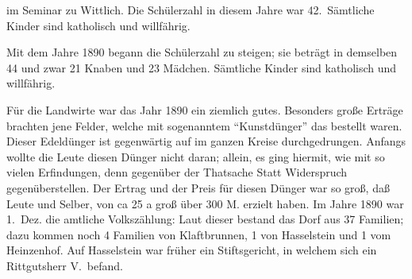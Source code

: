 

im Seminar zu Wittlich.\ob
Die Schülerzahl in diesem Jahre war 42.\ Sämtliche\ob
Kinder sind katholisch und willfährig.

\pend
{}
\pstart

Mit dem Jahre 1890 begann die Schülerzahl zu steigen;\ob
sie beträgt in demselben 44 und zwar 21 Knaben\ob
und 23 Mädchen. Sämtliche Kinder sind katholisch\ob
und willfährig.

Für die Landwirte war das Jahr 1890 ein ziemlich gutes.\ob
Besonders große Erträge brachten jene Felder, welche\ob
mit sogenanntem \enquote{Kunstdünger} das bestellt\ob
waren. Dieser Edeldünger\unsicher{} ist gegenwärtig auf im\ob
ganzen Kreise durchgedrungen. Anfangs wollte die Leute\ob
diesen Dünger nicht daran; allein, es ging hiermit, wie\ob
mit so vielen Erfindungen, denn gegenüber der\ob
Thatsache Statt Widerspruch gegenüberstellen. Der\ob
Ertrag und der Preis für diesen Dünger war so groß,\ob
daß Leute und Selber, von ca 25 a groß über 300 M.\ob
{}%
erzielt haben.\ob
Im Jahre 1890 war 1.\ Dez. die amtliche Volkszählung:\ob
Laut dieser bestand das Dorf aus 37 Familien; dazu\ob
kommen noch 4 Familien von Klaftbrunnen, 1 von\ob
Hasselstein und 1 vom Heinzenhof. Auf Hasselstein\ob
war früher ein Stiftsgericht, in welchem sich ein\ob
Rittgutsherr V.\ befand.
\pend
